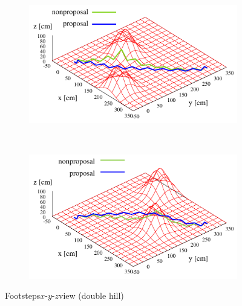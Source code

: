 \documentclass[autodetect-engine,dvipdfmx-if-dvi,ja=standard,a4j,jbase=11pt,magstyle=nomag*]{bxjsreport}
\begin{document}
\begin{figure}[pt]%
    \centering%
    \begin{subfigure}[c]{\linewidth}
        \centering%
        \includegraphics[width=\linewidth, clip]{./figure/sim_hrp2_hill2_100_0_xyz.pdf}%
        \label{fig:sim_hrp2_hill2_100_0_xyz}%
    \end{subfigure}\\ %
    \begin{subfigure}[c]{\linewidth}
        \centering%
        \includegraphics[width=\linewidth, clip]{./figure/sim_hrp2_hill2_100_2_xyz.pdf}%
        \label{fig:sim_hrp2_hill2_100_2_xyz}%
    \end{subfigure}%
    \caption{Footsteps$x$-$y$-$z$view (double hill)}%
    \label{fig:sim_hrp2_hill2}%
\end{figure}
\end{document}
